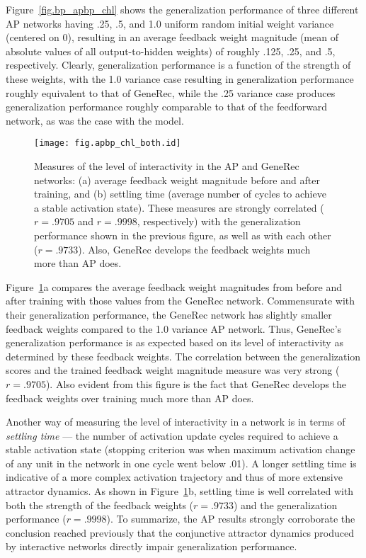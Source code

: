\documentclass[12pt,twoside]{article}
\begin{document}
Figure~\ref{fig.bp_apbp_chl} shows the generalization performance of
three different AP networks having .25, .5, and 1.0 uniform random
initial weight variance (centered on 0), resulting in an average
feedback weight magnitude (mean of absolute values of all
output-to-hidden weights) of roughly .125, .25, and .5, respectively.
Clearly, generalization performance is a function of the strength of
these weights, with the 1.0 variance case resulting in generalization
performance roughly equivalent to that of GeneRec, while the .25
variance case produces generalization performance roughly comparable
to that of the feedforward network, as was the case with the
 model.

\begin{figure}
  \centering\texttt{[image: fig.apbp\_chl\_both.id]}
  \caption{\small Measures of the level of interactivity in the AP and
    GeneRec networks: (a) average feedback weight magnitude before and
    after training, and (b) settling time (average number of cycles to
    achieve a stable activation state).  These measures are strongly
    correlated ($r=.9705$ and $r=.9998$, respectively) with the
    generalization performance shown in the previous figure, as well
    as with each other ($r=.9733$).  Also, GeneRec develops the
    feedback weights much more than AP does.}
  \label{fig.apbp_chl_both}
\end{figure}

Figure~\ref{fig.apbp_chl_both}a compares the average feedback weight
magnitudes from before and after training with those values from the
GeneRec network.  Commensurate with their generalization performance,
the GeneRec network has slightly smaller feedback weights compared to
the 1.0 variance AP network.  Thus, GeneRec's generalization
performance is as expected based on its level of interactivity as
determined by these feedback weights.  The correlation between the
generalization scores and the trained feedback weight magnitude
measure was very strong ($r=.9705$).  Also evident from this figure is
the fact that GeneRec develops the feedback weights over training much
more than AP does.

Another way of measuring the level of interactivity in a network is in
terms of {\em settling time} --- the number of activation update
cycles required to achieve a stable activation state (stopping
criterion was when maximum activation change of any unit in the
network in one cycle went below .01).  A longer settling time is
indicative of a more complex activation trajectory and thus of more
extensive attractor dynamics.  As shown in
Figure~\ref{fig.apbp_chl_both}b, settling time is well correlated with
both the strength of the feedback weights ($r=.9733$) and the
generalization performance ($r=.9998$).  To summarize, the AP results
strongly corroborate the conclusion reached previously that the
conjunctive attractor dynamics produced by interactive networks
directly impair generalization performance.
\end{document}

